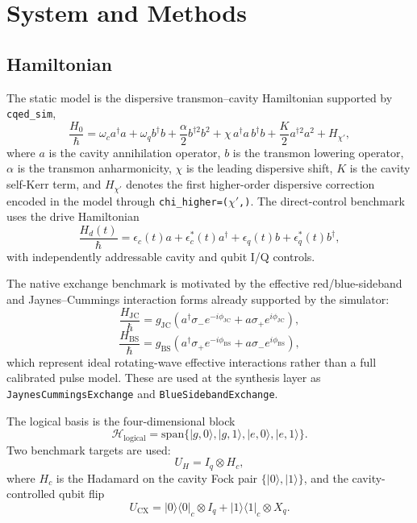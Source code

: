 \documentclass[11pt, a4paper]{article}
\begin{document}
\section{System and Methods}

\subsection{Hamiltonian}
The static model is the dispersive transmon--cavity Hamiltonian supported by
\texttt{cqed\_sim},
\begin{equation}
\frac{H_0}{\hbar}
=
\omega_c a^\dagger a
+ \omega_q b^\dagger b
+ \frac{\alpha}{2} b^{\dagger 2} b^2
+ \chi\, a^\dagger a\, b^\dagger b
+ \frac{K}{2} a^{\dagger 2} a^2
+ H_{\chi'},
\end{equation}
where \(a\) is the cavity annihilation operator, \(b\) is the transmon lowering
operator, \(\alpha\) is the transmon anharmonicity, \(\chi\) is the leading
dispersive shift, \(K\) is the cavity self-Kerr term, and \(H_{\chi'}\) denotes
the first higher-order dispersive correction encoded in the model through
\texttt{chi\_higher=(\(\chi'\),)}. The direct-control benchmark uses the drive
Hamiltonian
\begin{equation}
\frac{H_d(t)}{\hbar}
=
\epsilon_c(t) a + \epsilon_c^\ast(t) a^\dagger
+ \epsilon_q(t) b + \epsilon_q^\ast(t) b^\dagger,
\end{equation}
with independently addressable cavity and qubit I/Q controls.

The native exchange benchmark is motivated by the effective red/blue-sideband
and Jaynes--Cummings interaction forms already supported by the simulator:
\begin{equation}
\frac{H_{\mathrm{JC}}}{\hbar}
=
g_{\mathrm{JC}}
\left(
a^\dagger \sigma_- e^{-i\phi_{\mathrm{JC}}}
+ a \sigma_+ e^{i\phi_{\mathrm{JC}}}
\right),
\end{equation}
\begin{equation}
\frac{H_{\mathrm{BS}}}{\hbar}
=
g_{\mathrm{BS}}
\left(
a^\dagger \sigma_+ e^{-i\phi_{\mathrm{BS}}}
+ a \sigma_- e^{i\phi_{\mathrm{BS}}}
\right),
\end{equation}
which represent ideal rotating-wave effective interactions rather than a full
calibrated pulse model. These are used at the synthesis layer as
\texttt{JaynesCummingsExchange} and \texttt{BlueSidebandExchange}.

The logical basis is the four-dimensional block
\begin{equation}
\mathcal{H}_{\mathrm{logical}}
=
\mathrm{span}\{
|g,0\rangle, |g,1\rangle, |e,0\rangle, |e,1\rangle
\}.
\end{equation}
Two benchmark targets are used:
\begin{equation}
U_H = I_q \otimes H_c,
\end{equation}
where \(H_c\) is the Hadamard on the cavity Fock pair \(\{|0\rangle,|1\rangle\}\),
and the cavity-controlled qubit flip
\begin{equation}
U_{\mathrm{CX}}
=
|0\rangle\langle 0|_c \otimes I_q
+ |1\rangle\langle 1|_c \otimes X_q.
\end{equation}
\end{document}
